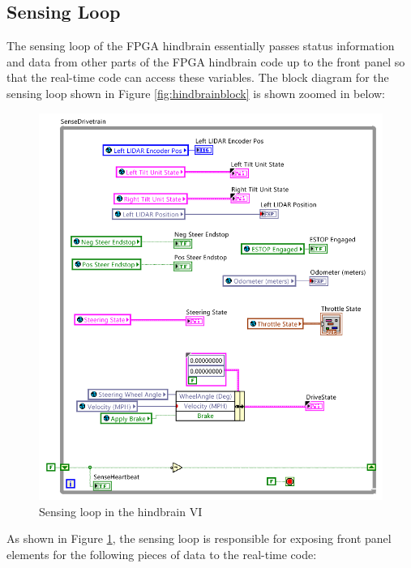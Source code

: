 \subsection{Sensing Loop}

The sensing loop of the FPGA hindbrain essentially passes status information and data from other parts of the FPGA hindbrain code up to the front panel so that the real-time code can access these variables. The block diagram for the sensing loop shown in Figure \ref{fig:hindbrainblock} is shown zoomed in below: 

\newpage

\begin{figure}[h!]
\centering
\includegraphics[scale=1.5]{Photos/sensingloop.png}
\caption{Sensing loop in the hindbrain VI}
\label{fig:sensingloop}
\end{figure} 

\noindent As shown in Figure \ref{fig:sensingloop}, the sensing loop is responsible for exposing front panel elements for the following pieces of data to the real-time code:

